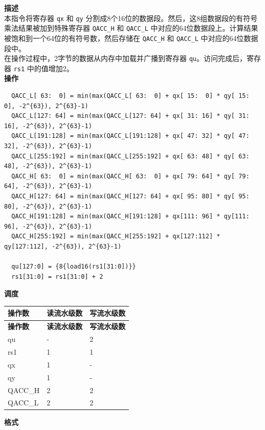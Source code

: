 \textbf{描述}\\
本指令将寄存器 \lstinline{qx} 和 \lstinline{qy} 分割成8个16位的数据段。然后，这8组数据段的有符号乘法结果被加到特殊寄存器 \lstinline{QACC_H} 和 \lstinline{QACC_L} 中对应的64位数据段上。计算结果被饱和到一个64位的有符号数，然后存储在 \lstinline{QACC_H} 和 \lstinline{QACC_L} 中对应的64位数据段中。\\
在操作过程中，2字节的数据从内存中加载并广播到寄存器 \lstinline{qu}。访问完成后，寄存器 \lstinline{rs1} 中的值增加2。\\
\textbf{操作}
\begin{lstlisting}
  QACC_L[ 63:  0] = min(max(QACC_L[ 63:  0] + qx[ 15:  0] * qy[ 15:  0], -2^{63}), 2^{63}-1)
  QACC_L[127: 64] = min(max(QACC_L[127: 64] + qx[ 31: 16] * qy[ 31: 16], -2^{63}), 2^{63}-1)
  QACC_L[191:128] = min(max(QACC_L[191:128] + qx[ 47: 32] * qy[ 47: 32], -2^{63}), 2^{63}-1)
  QACC_L[255:192] = min(max(QACC_L[255:192] + qx[ 63: 48] * qy[ 63: 48], -2^{63}), 2^{63}-1)
  QACC_H[ 63:  0] = min(max(QACC_H[ 63:  0] + qx[ 79: 64] * qy[ 79: 64], -2^{63}), 2^{63}-1)
  QACC_H[127: 64] = min(max(QACC_H[127: 64] + qx[ 95: 80] * qy[ 95: 80], -2^{63}), 2^{63}-1)
  QACC_H[191:128] = min(max(QACC_H[191:128] + qx[111: 96] * qy[111: 96], -2^{63}), 2^{63}-1)
  QACC_H[255:192] = min(max(QACC_H[255:192] + qx[127:112] * qy[127:112], -2^{63}), 2^{63}-1)

  qu[127:0] = {8{load16(rs1[31:0])}}
  rs1[31:0] = rs1[31:0] + 2
\end{lstlisting}

\textbf{调度}\\
\begin{longtable}[c]{|l|l|l|}
    \hline
    \rowcolor{lightgray}
    \textbf{操作数} & \textbf{读流水级数} & \textbf{写流水级数} \\\hline
    \endfirsthead
    \hline
    \rowcolor{lightgray}
     \textbf{操作数} & \textbf{读流水级数} & \textbf{写流水级数} \\\hline
    \endhead
    \hline
    \endfoot

    qu & - & 2 \\\hline
    rs1 & 1 & 1 \\\hline
     qx & 1 & - \\\hline
     qy & 1 & - \\\hline
     QACC\_H & 2 & 2 \\\hline
     QACC\_L & 2 & 2

\end{longtable}

\textbf{格式}\\

